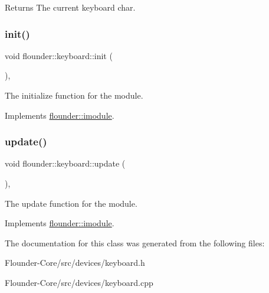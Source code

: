 \begin{DoxyReturn}{Returns}
The current keyboard char. 
\end{DoxyReturn}
\mbox{\label{classflounder_1_1keyboard_a624374ba5d79431171a44ed332e63322}} 
\subsubsection{\texorpdfstring{init()}{init()}}
{\footnotesize\ttfamily void flounder\+::keyboard\+::init (\begin{DoxyParamCaption}{ }\end{DoxyParamCaption})\hspace{0.3cm}{\ttfamily [override]}, {\ttfamily [virtual]}}



The initialize function for the module. 



Implements \hyperlink{classflounder_1_1imodule_a1725ef346952884d0741de61aba1e0c7}{flounder\+::imodule}.

\mbox{\label{classflounder_1_1keyboard_a9fe79eabe905466fd90413d2c3b68841}} 
\subsubsection{\texorpdfstring{update()}{update()}}
{\footnotesize\ttfamily void flounder\+::keyboard\+::update (\begin{DoxyParamCaption}{ }\end{DoxyParamCaption})\hspace{0.3cm}{\ttfamily [override]}, {\ttfamily [virtual]}}



The update function for the module. 



Implements \hyperlink{classflounder_1_1imodule_a9a53d48a46b5f6b16a92b2cd8503f74a}{flounder\+::imodule}.



The documentation for this class was generated from the following files\+:\begin{DoxyCompactItemize}
\item 
Flounder-\/\+Core/src/devices/keyboard.\+h\item 
Flounder-\/\+Core/src/devices/keyboard.\+cpp\end{DoxyCompactItemize}

